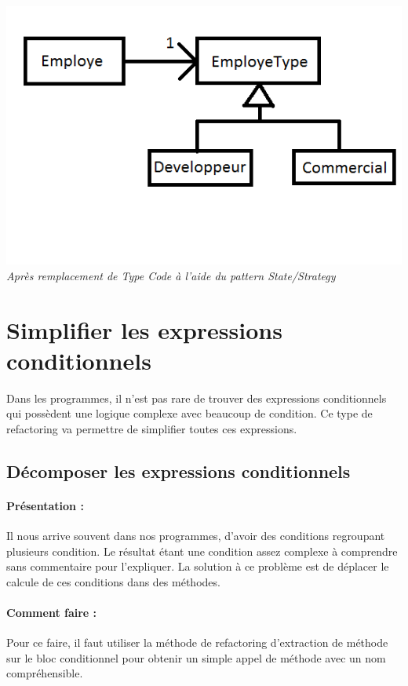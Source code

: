 \documentclass[a4paper,twoside,12pt,openright]{report}
\begin{document}
\begin{center}
\includegraphics[scale=1]{Image/TypeCode_State.png}\\
\itshape{Après remplacement de Type Code à l'aide du pattern State/Strategy}
\end{center}


\newpage
\section{Simplifier les expressions conditionnels}
Dans les programmes, il n'est pas rare de trouver des expressions conditionnels qui possèdent une logique complexe avec beaucoup de condition. Ce type de refactoring va permettre de simplifier toutes ces expressions.



\subsection{Décomposer les expressions conditionnels}
\paragraph{Présentation :}
Il nous arrive souvent dans nos programmes, d'avoir des conditions regroupant plusieurs condition. Le résultat étant une condition assez complexe à comprendre sans commentaire pour l'expliquer. La solution à ce problème est de déplacer le calcule de ces conditions dans des méthodes.

\paragraph{Comment faire :}
Pour ce faire, il faut utiliser la méthode de refactoring d'extraction de méthode sur le bloc conditionnel pour obtenir un simple appel de méthode avec un nom compréhensible.
\end{document}
